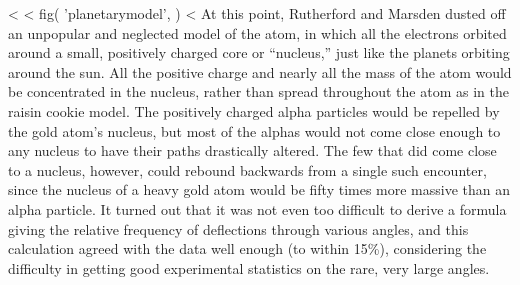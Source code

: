         <%
<%
  fig(
    'planetarymodel',
  )
<%
         At this point, Rutherford and Marsden dusted off an
        unpopular and neglected model of the atom, in which all the
        electrons orbited around a small, positively charged core or
        ``nucleus,'' just like the planets
        orbiting around the sun. All the positive charge and nearly
        all the mass of the atom would be concentrated in the
        nucleus, rather than spread throughout the atom as in the
        raisin cookie model. The positively charged alpha
        particles would be repelled by the gold atom's nucleus, but
        most of the alphas would not come close enough to any
        nucleus to have their paths drastically altered. The few
        that did come close to a nucleus, however, could rebound
        backwards from a single such encounter, since the nucleus of
        a heavy gold atom would be fifty times more massive than an
        alpha particle. It turned out that it was not even too
        difficult to derive a formula giving the relative frequency
        of deflections through various angles, and this calculation
        agreed with the data well enough (to within 15\%),
        considering the difficulty in getting good experimental
        statistics on the rare, very large angles.

